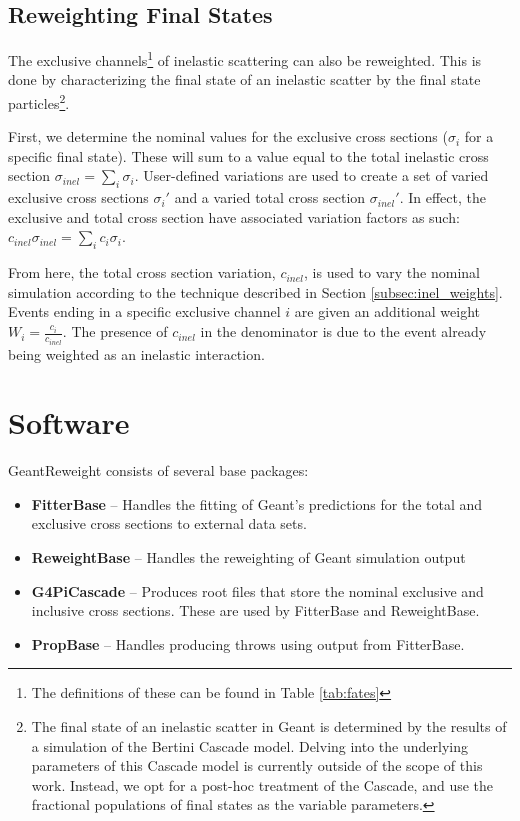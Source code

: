\documentclass[12pt]{article}
\begin{document}
\subsection{Reweighting Final States}\label{subsec:fs_rw}
The exclusive channels\footnote{The definitions of these can be found in Table \ref{tab:fates}} of inelastic scattering can also be reweighted. This is done by characterizing the final state of an inelastic scatter by the final state particles\footnote{The final state of an inelastic scatter in Geant is determined by the results of a simulation of the Bertini Cascade model. Delving into the underlying parameters of this Cascade model is currently outside of the scope of this work. Instead, we opt for a post-hoc treatment of the Cascade, and use the fractional populations of final states as the variable parameters.}. 

First, we determine the nominal values for the exclusive cross sections ($\sigma_{i}$ for a specific final state). These will sum to a value equal to the total inelastic cross section $\sigma_{inel} = \sum\limits_{i}\sigma_{i}$. User-defined variations are used to create a set of varied exclusive cross sections $\sigma_{i}'$ and a varied total cross section $\sigma_{inel}'$. In effect, the exclusive and total cross section have associated variation factors as such: $c_{inel}\sigma_{inel}  = \sum\limits_{i} c_{i} \sigma_{i}$. 

From here, the total cross section variation, $c_{inel}$, is used to vary the nominal simulation according to the technique described in Section \ref{subsec:inel_weights}. Events ending in a specific exclusive channel $i$ are given an additional weight $W_{i} = \frac{c_i}{c_{inel}}$. The presence of $c_{inel}$ in the denominator is due to the event already being weighted as an inelastic interaction. 


\section{Software}
GeantReweight consists of several base packages:
\begin{itemize}
	\item \textbf{FitterBase} -- Handles the fitting of Geant's predictions for the total and exclusive cross sections to external data sets.
	\item \textbf{ReweightBase} -- Handles the reweighting of Geant simulation output
	\item \textbf{G4PiCascade} -- Produces root files that store the nominal exclusive and inclusive cross sections. These are used by FitterBase and ReweightBase. 
	\item \textbf{PropBase} -- Handles producing throws using output from FitterBase.
\end{itemize}
\end{document}
